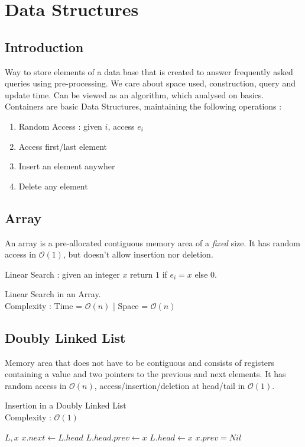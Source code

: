 \documentclass{cours}
\begin{document}
\section{Data Structures}
\subsection{Introduction}
Way to store elements of a data base that is created to answer frequently asked queries using pre-processing.
We care about space used, construction, query and update time.
Can be viewed as an algorithm, which analysed on basics.
Containers are basic Data Structures, maintaining the following operations :
\begin{enumerate}
    \item Random Access : given $i$, access $e_{i}$
    \item Access first/last element
    \item Insert an element anywher
    \item Delete any element
\end{enumerate}

\subsection{Array}
An array is a pre-allocated contiguous memory area of a \emph{fixed} size. It has random access in $\mathcal{O}(1)$, but doesn't allow insertion nor deletion.

Linear Search : given an integer $x$ return $1$ if $e_{i} = x$ else 0.
\begin{algorithm}
    \caption{Linear Search in an Array. \\ Complexity : Time = $\mathcal{O}(n)$ | Space = $\mathcal{O}(n)$}
\end{algorithm}

\subsection{Doubly Linked List}
Memory area that does not have to be contiguous and consists of registers containing a value and two pointers to the previous and next elements.
It has random access in $\mathcal{O}(n)$, access/insertion/deletion at head/tail in $\mathcal{O}(1)$.
\begin{algorithm}
    \caption{Insertion in a Doubly Linked List \\ Complexity : $\mathcal{O}(1)$}
    \begin{algorithmic}
        \Input
        $ L, x$
        \EndInput
        \State $x.next \gets L.head$
        \State $L.head.prev \gets x$
        \EndIf
        \State $L.head \gets x$
        \State $x.prev = Nil$
    \end{algorithmic}
\end{algorithm}
\end{document}
